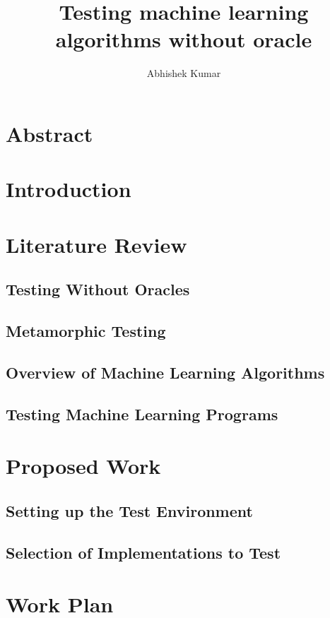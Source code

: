 \documentclass[12pt]{report}
\begin{document}
	\author{Abhishek Kumar}
	\title{ Testing machine learning algorithms without oracle }
	\maketitle

	\chapter*{Abstract}
	
	\chapter{Introduction}
	
	\chapter{Literature Review}
	\section{Testing Without Oracles}
	\section{Metamorphic Testing}
	\section{Overview of Machine Learning Algorithms}
	\section{Testing Machine Learning Programs}
	
	\chapter{Proposed Work}
	\section{Setting up the Test Environment}
	\section{Selection of Implementations to Test}
	
	\chapter{Work Plan}
	
	\nocite{*}
	
	
	
\end{document}

